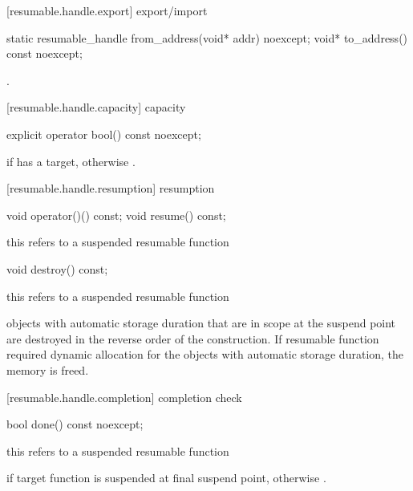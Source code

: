 [resumable.handle.export]{ export/import}
\begin{itemdecl}
  static resumable_handle from_address(void* addr) noexcept;		
  void* to_address() const noexcept;
\end{itemdecl}

\begin{itemdescr}
  \pnum
  \postconditions {}.
\end{itemdescr}

[resumable.handle.capacity]{ capacity}
\begin{itemdecl}
  explicit operator bool() const noexcept;
\end{itemdecl}

\begin{itemdescr}
  \pnum
  \returns {} if  has a target, otherwise .
\end{itemdescr}

[resumable.handle.resumption]{ resumption}
\begin{itemdecl}
  void operator()() const;
  void resume() const;	
\end{itemdecl}
\begin{itemdescr}
  \pnum
  \precondition *this refers to a suspended resumable function
  
  \pnum
\end{itemdescr}

\begin{itemdecl}
  void destroy() const;
\end{itemdecl}
\begin{itemdescr}
  \pnum
  \precondition *this refers to a suspended resumable function
  
  \pnum
  \effects objects with automatic storage duration that are in scope
  at the suspend point are destroyed in the reverse order of the construction. If resumable function required dynamic allocation
  for the objects with automatic storage duration, the memory
  is freed.
\end{itemdescr}

[resumable.handle.completion]{ completion check}
\begin{itemdecl}
  bool done() const noexcept; 
\end{itemdecl}
\begin{itemdescr}
  \pnum
  \precondition *this refers to a suspended resumable function
  
  \pnum
  \returns {} if target function is suspended
  at final suspend point, otherwise .
\end{itemdescr}

